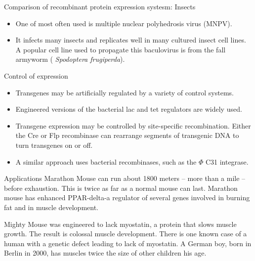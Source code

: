 \documentclass[11pt,dvipsnames,ignorenonframetext,aspectratio=169]{beamer}
\providecommand{\tightlist}{%
  \setlength{\itemsep}{0pt}\setlength{\parskip}{0pt}}
\begin{document}
\begin{frame}{Comparison of recombinant protein expression systesm:
Insects}
\protect\hypertarget{comparison-of-recombinant-protein-expression-systesm-insects-1}{}
\begin{itemize}
\tightlist
\item
  One of most often used is multiple nuclear polyhedrosis virus (MNPV).
\item
  It infects many insects and replicates well in many cultured insect
  cell lines. A popular cell line used to propagate this baculovirus is
  from the fall armyworm ( \emph{Spodoptera frugiperda}).
\end{itemize}
\end{frame}

\begin{frame}{Control of expression}
\protect\hypertarget{control-of-expression}{}
\begin{itemize}
\tightlist
\item
  Transgenes may be artificially regulated by a variety of control
  systems.
\item
  Engineered versions of the bacterial lac and tet regulators are widely
  used.
\item
  Transgene expression may be controlled by site-specific recombination.
  Either the Cre or Flp recombinase can rearrange segments of transgenic
  DNA to turn transgenes on or off.
\item
  A similar approach uses bacterial recombinases, such as the \(\Phi\)
  C31 integrase.
\end{itemize}
\end{frame}

\begin{frame}{Applications}
\protect\hypertarget{applications}{}
Marathon Mouse can run about 1800 meters -- more than a mile -- before
exhaustion. This is twice as far as a normal mouse can last. Marathon
mouse has enhanced PPAR-delta-a regulator of several genes involved in
burning fat and in muscle development.

Mighty Mouse was engineered to lack myostatin, a protein that slows
muscle growth. The result is colossal muscle development. There is one
known case of a human with a genetic defect leading to lack of
myostatin. A German boy, born in Berlin in 2000, has muscles twice the
size of other children his age.
\end{frame}
\end{document}
